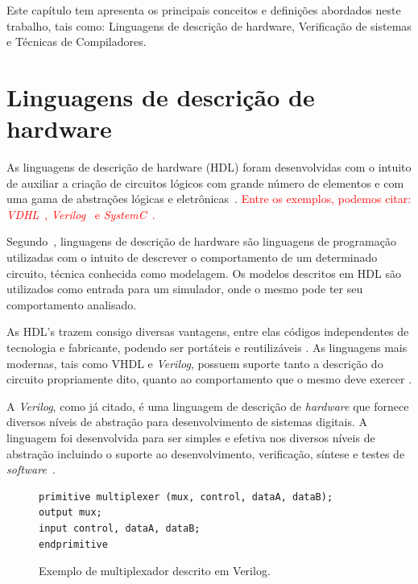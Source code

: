 \label{chapter:conceitos}
Este capítulo tem apresenta os principais conceitos e definições abordados neste trabalho, tais como: Linguagens de descrição de hardware, Verificação de sistemas e Técnicas de Compiladores.

\section{Linguagens de descrição de hardware}

As linguagens de descrição de hardware (HDL) foram desenvolvidas com o intuito de auxiliar a criação de circuitos lógicos com grande número de elementos e com uma gama de abstrações lógicas e eletrônicas~\cite{thomas2008verilog}. \textcolor{red}{Entre os exemplos, podemos citar: \textit{VDHL}~\cite{IEEEVHDLLanguage}, \textit{Verilog}~\cite{IEEEVerilogLanguage} e \textit{SystemC}~\cite{IEEESystemCLanguage}.}

\par
Segundo~\cite{christen1999vhdl}, linguagens de descrição de hardware são linguagens de programação utilizadas com o intuito de descrever o comportamento de um determinado circuito, técnica conhecida como modelagem. Os modelos descritos em HDL são utilizados como entrada para um simulador, onde o mesmo pode ter seu comportamento analisado.

\par
As HDL's trazem consigo diversas vantagens, entre elas códigos independentes de tecnologia e fabricante, podendo ser portáteis e reutilizáveis \cite{cappelattipraticando}. As linguagens mais modernas, tais como VHDL e \textit{Verilog}, possuem suporte tanto a descrição do circuito propriamente dito, quanto ao comportamento que o mesmo deve exercer \cite{christen1999vhdl}.

\par
A \textit{Verilog}, como já citado, é uma linguagem de descrição de \textit{hardware} que fornece diversos níveis de abstração para desenvolvimento de sistemas digitais\cite{thomas2008verilog}. A linguagem foi desenvolvida para ser simples e efetiva nos diversos níveis de abstração incluindo o suporte ao desenvolvimento, verificação, síntese e testes de \textit{software}~\cite{IEEEVerilogLanguage}.

\begin{figure}[H]
\caption{\label{fig:mux_verilog} Exemplo de multiplexador descrito em Verilog.}
	\begin{center}
    \begin{minipage}{0.7\textwidth}
    \begin{lstlisting}       
primitive multiplexer (mux, control, dataA, dataB);
output mux;
input control, dataA, dataB;
endprimitive
\end{lstlisting}
    \end{minipage}
	\end{center}
\end{figure}

